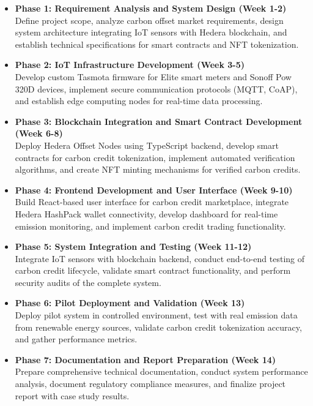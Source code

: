 \documentclass[oneside,a4paper,12pt]{book}
\begin{document}
\begin{itemize}
    \item \textbf{Phase 1: Requirement Analysis and System Design (Week 1-2)}\\
    Define project scope, analyze carbon offset market requirements, design system architecture integrating IoT sensors with Hedera blockchain, and establish technical specifications for smart contracts and NFT tokenization.

    \item \textbf{Phase 2: IoT Infrastructure Development (Week 3-5)}\\
    Develop custom Tasmota firmware for Elite smart meters and Sonoff Pow 320D devices, implement secure communication protocols (MQTT, CoAP), and establish edge computing nodes for real-time data processing.

    \item \textbf{Phase 3: Blockchain Integration and Smart Contract Development (Week 6-8)}\\
    Deploy Hedera Offset Nodes using TypeScript backend, develop smart contracts for carbon credit tokenization, implement automated verification algorithms, and create NFT minting mechanisms for verified carbon credits.

    \item \textbf{Phase 4: Frontend Development and User Interface (Week 9-10)}\\
    Build React-based user interface for carbon credit marketplace, integrate Hedera HashPack wallet connectivity, develop dashboard for real-time emission monitoring, and implement carbon credit trading functionality.

    \item \textbf{Phase 5: System Integration and Testing (Week 11-12)}\\
    Integrate IoT sensors with blockchain backend, conduct end-to-end testing of carbon credit lifecycle, validate smart contract functionality, and perform security audits of the complete system.

    \item \textbf{Phase 6: Pilot Deployment and Validation (Week 13)}\\
    Deploy pilot system in controlled environment, test with real emission data from renewable energy sources, validate carbon credit tokenization accuracy, and gather performance metrics.

    \item \textbf{Phase 7: Documentation and Report Preparation (Week 14)}\\
    Prepare comprehensive technical documentation, conduct system performance analysis, document regulatory compliance measures, and finalize project report with case study results.
\end{itemize}
\end{document}
